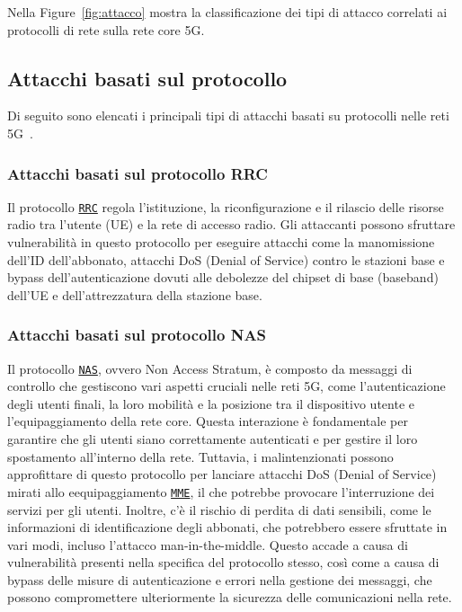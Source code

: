 \documentclass[english]{article}
\begin{document}
Nella Figure~\ref{fig:attacco} mostra la classificazione dei tipi di attacco
correlati ai protocolli di rete sulla rete core 5G.

\subsection{Attacchi basati sul protocollo}
Di seguito sono elencati i principali tipi di attacchi basati su protocolli
nelle reti 5G~\cite{Kim20205G}.

\subsubsection{Attacchi basati sul protocollo RRC}
Il protocollo \texttt{\hyperlink{RRC}{RRC}} regola l'istituzione, la
riconfigurazione e il rilascio delle risorse radio tra l'utente (UE) e la rete
di accesso radio. Gli attaccanti possono sfruttare vulnerabilità in questo
protocollo per eseguire attacchi come la manomissione dell'ID dell'abbonato,
attacchi DoS (Denial of Service) contro le stazioni base e bypass
dell'autenticazione dovuti alle debolezze del chipset di base (baseband)
dell'UE e dell'attrezzatura della stazione base.

\subsubsection{Attacchi basati sul protocollo NAS}
Il protocollo \texttt{\hyperlink{NAS}{NAS}}, ovvero Non Access Stratum, è
composto da messaggi di controllo che gestiscono vari aspetti cruciali nelle
reti 5G, come l'autenticazione degli utenti finali, la loro mobilità e la
posizione tra il dispositivo utente e l'equipaggiamento della rete core.\@
Questa interazione è fondamentale per garantire che gli utenti siano
correttamente autenticati e per gestire il loro spostamento all'interno della
rete. Tuttavia, i malintenzionati possono approfittare di questo protocollo per
lanciare attacchi DoS (Denial of Service) mirati allo eequipaggiamento
\texttt{\hyperlink{MME}{MME}}, il che potrebbe provocare l'interruzione dei
servizi per gli utenti. Inoltre, c'è il rischio di perdita di dati sensibili,
come le informazioni di identificazione degli abbonati, che potrebbero essere
sfruttate in vari modi, incluso l'attacco man-in-the-middle. Questo accade a
causa di vulnerabilità presenti nella specifica del protocollo stesso, così
come a causa di bypass delle misure di autenticazione e errori nella gestione
dei messaggi, che possono compromettere ulteriormente la sicurezza delle
comunicazioni nella rete.
\end{document}
